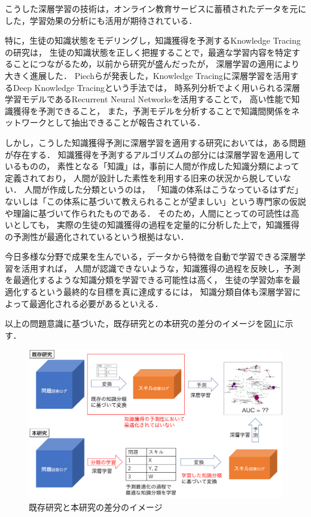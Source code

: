 こうした深層学習の技術は，オンライン教育サービスに蓄積されたデータを元にした，学習効果の分析にも活用が期待されている．

特に，生徒の知識状態をモデリングし，知識獲得を予測するKnowledge Tracingの研究は，
生徒の知識状態を正しく把握することで，最適な学習内容を特定することにつながるため，以前から研究が盛んだったが，
深層学習の適用により大きく進展した．
Piechらが発表した，Knowledge Tracingに深層学習を活用するDeep Knowledge Tracingという手法では，
時系列分析でよく用いられる深層学習モデルであるRecurrent Neural Networks\cite{williams1989learning}を活用することで，
高い性能で知識獲得を予測できること，
また，予測モデルを分析することで知識間関係をネットワークとして抽出できることが報告されている\cite{piech2015deep}．


しかし，こうした知識獲得予測に深層学習を適用する研究においては，ある問題が存在する．
知識獲得を予測するアルゴリズムの部分には深層学習を適用しているものの，
素性となる「知識」は，事前に人間が作成した知識分類によって定義されており，
人間が設計した素性を利用する旧来の状況から脱していない．
人間が作成した分類というのは，
「知識の体系はこうなっているはずだ」ないしは「この体系に基づいて教えられることが望ましい」という専門家の仮説や理論に基づいて作られたものである．
そのため，人間にとっての可読性は高いとしても，
実際の生徒の知識獲得の過程を定量的に分析した上で，知識獲得の予測性が最適化されているという根拠はない．

今日多様な分野で成果を生んでいる，データから特徴を自動で学習できる深層学習を活用すれば，
人間が認識できないような，知識獲得の過程を反映し，予測を最適化するような知識分類を学習できる可能性は高く，
生徒の学習効率を最適化するという最終的な目標を真に達成するには，
知識分類自体も深層学習によって最適化される必要があるといえる．

以上の問題意識に基づいた，既存研究との本研究の差分のイメージを図\ref{fig:problem}に示す．
\begin{figure}[htb]
\begin{center}
\includegraphics[width=350pt]{./img/problem.png}
\end{center}
\caption{既存研究と本研究の差分のイメージ}
\label{fig:problem}
\end{figure}


